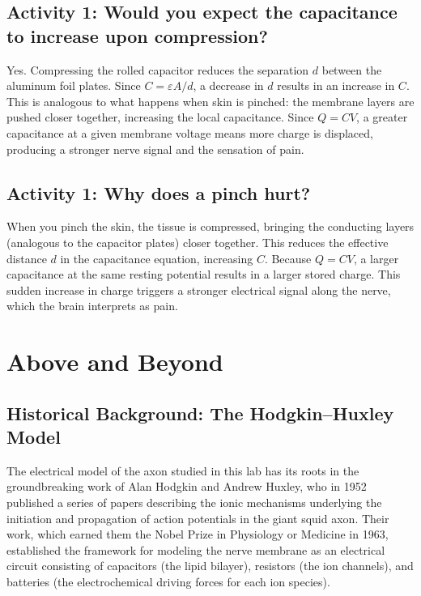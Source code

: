 \message{ !name(lab_report.tex)}\documentclass[12pt]{article}
\begin{document}
\subsection*{Activity 1: Would you expect the capacitance to increase upon compression?}

Yes. Compressing the rolled capacitor reduces the separation $d$ between the aluminum foil plates. Since $C = \varepsilon A / d$, a decrease in $d$ results in an increase in $C$. This is analogous to what happens when skin is pinched: the membrane layers are pushed closer together, increasing the local capacitance. Since $Q = CV$, a greater capacitance at a given membrane voltage means more charge is displaced, producing a stronger nerve signal and the sensation of pain.

\subsection*{Activity 1: Why does a pinch hurt?}

When you pinch the skin, the tissue is compressed, bringing the conducting layers (analogous to the capacitor plates) closer together. This reduces the effective distance $d$ in the capacitance equation, increasing $C$. Because $Q = CV$, a larger capacitance at the same resting potential results in a larger stored charge. This sudden increase in charge triggers a stronger electrical signal along the nerve, which the brain interprets as pain.

\section{Above and Beyond}

\subsection{Historical Background: The Hodgkin--Huxley Model}

The electrical model of the axon studied in this lab has its roots in the groundbreaking work of Alan Hodgkin and Andrew Huxley, who in 1952 published a series of papers describing the ionic mechanisms underlying the initiation and propagation of action potentials in the giant squid axon. Their work, which earned them the Nobel Prize in Physiology or Medicine in 1963, established the framework for modeling the nerve membrane as an electrical circuit consisting of capacitors (the lipid bilayer), resistors (the ion channels), and batteries (the electrochemical driving forces for each ion species).
\end{document}
